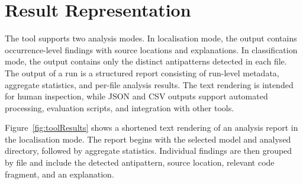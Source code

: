 \section{Result Representation}

The tool supports two analysis modes. In localisation mode, the output contains occurrence-level findings with source locations and explanations. In classification mode, the output contains only the distinct antipatterns detected in each file. The output of a run is a structured report consisting of run-level metadata, aggregate statistics, and per-file analysis results. The text rendering is intended for human inspection, while JSON and CSV outputs support automated processing, evaluation scripts, and integration with other tools.

Figure~\ref{fig:toolResults} shows a shortened text rendering of an analysis report in the localisation mode. The report begins with the selected model and analysed directory, followed by aggregate statistics. Individual findings are then grouped by file and include the detected antipattern, source location, relevant code fragment, and an explanation.

